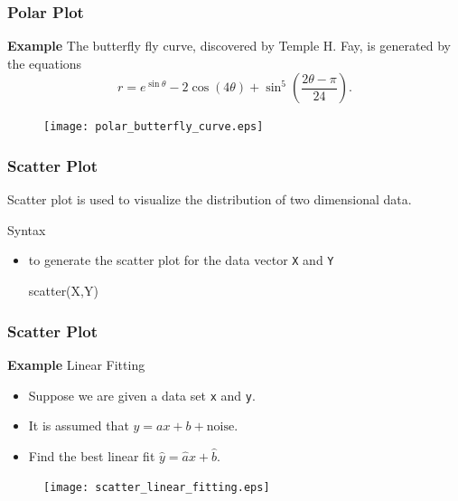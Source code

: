 \documentclass[compress]{beamer}  %
\begin{document}
\begin{frame}[fragile]
\frametitle{Polar Plot}
\textbf{Example} 
The butterfly fly curve, discovered by Temple H. Fay, is generated by the equations
\begin{equation}
r=e^{\sin \theta} - 2 \cos (4 \theta ) + \sin^5\left(\frac{2 \theta - \pi}{24}\right).
\end{equation}\pause

\setcounter{subfigure}{0}
\begin{figure}
    \centering
    \texttt{[image: polar\_butterfly\_curve.eps]}
\end{figure}

\end{frame}
\begin{frame}[fragile]
\frametitle{Scatter Plot}
Scatter plot is used to visualize the distribution of two dimensional data.

\begin{block}{Syntax}
\begin{itemize}
    \item to generate the scatter plot for the data vector \texttt{X} and \texttt{Y}
          \begin{matlabcodebeamer}[numbers=none,frame=none,backgroundcolor=\color{blockbody}]
          scatter(X,Y)
          \end{matlabcodebeamer}
\end{itemize}
\end{block}


\end{frame}
\begin{frame}[fragile]
\frametitle{Scatter Plot}
\textbf{Example} Linear Fitting

\begin{itemize}[<+->]
    \item Suppose we are given a data set \texttt{x} and \texttt{y}.
    \item It is assumed that $y = ax + b + \mbox{noise}$.
    \item Find the best linear fit $\hat{y} = \hat{a} x + \hat{b}$.
\end{itemize}
\pause
\setcounter{subfigure}{0}
\begin{figure}
    \centering
    \texttt{[image: scatter\_linear\_fitting.eps]}
\end{figure}

\end{frame}
\end{document}
